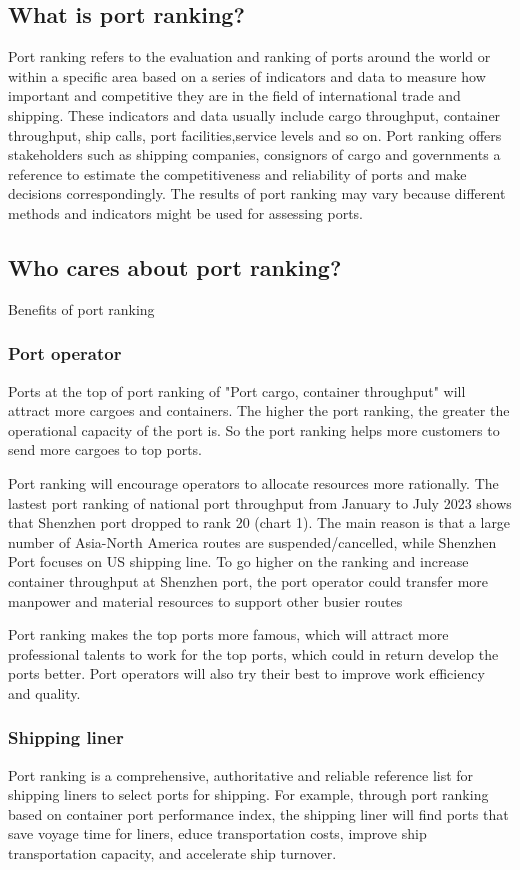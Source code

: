 \documentclass[preprint]{elsarticle}
\begin{document}
 \subsection{What is port ranking?}
 Port ranking refers to the evaluation and ranking of ports around the world or within a specific area based on a series of indicators and data to measure how important and competitive they are in the field of international trade and shipping. These indicators and data usually include cargo throughput, container throughput, ship calls, port facilities,service levels and so on. Port ranking offers stakeholders such as shipping companies, consignors of cargo and governments a reference to estimate the competitiveness and reliability of ports and make  decisions correspondingly. The results of port ranking may vary because different methods and indicators might be used for assessing ports. 
 \subsection{Who cares about port ranking?}
 Benefits of port ranking

 \subsubsection{Port operator}
 Ports at the top of port ranking of "Port cargo, container throughput" will attract more cargoes and containers. The higher the port ranking, the greater the operational capacity of the port is. So the port ranking helps more customers to send more cargoes to top ports. 
 
 Port ranking will encourage operators to allocate resources more rationally. The lastest port ranking of national port throughput from January to July 2023 shows that Shenzhen port dropped to rank 20 (chart 1). The main reason is that a large number of Asia-North America routes are suspended/cancelled, while Shenzhen Port focuses on US shipping line. To go higher on the ranking and increase container throughput at Shenzhen port, the port operator could transfer more manpower and material resources to support other busier routes

 Port ranking makes the top ports more famous, which will attract more professional talents to work for the top ports, which could in return develop the ports better. Port operators will also try their best to improve work efficiency and quality.
 \subsubsection{Shipping liner}
 Port ranking is a comprehensive, authoritative and reliable reference list for shipping liners to select ports for shipping.
For example, through port ranking based on container port performance index, the shipping liner will find ports that save voyage time for liners, educe transportation costs, improve ship transportation capacity, and accelerate ship turnover.
\end{document}
